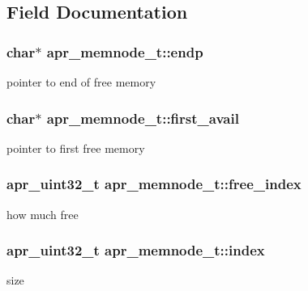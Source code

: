 \subsection{Field Documentation}
\subsubsection[{\texorpdfstring{endp}{endp}}]{\setlength{\rightskip}{0pt plus 5cm}char$\ast$ apr\+\_\+memnode\+\_\+t\+::endp}\hypertarget{structapr__memnode__t_a35c9bf71f1cc680929f857176b547a05}{}\label{structapr__memnode__t_a35c9bf71f1cc680929f857176b547a05}
pointer to end of free memory 
\subsubsection[{\texorpdfstring{first\+\_\+avail}{first_avail}}]{\setlength{\rightskip}{0pt plus 5cm}char$\ast$ apr\+\_\+memnode\+\_\+t\+::first\+\_\+avail}\hypertarget{structapr__memnode__t_a863e7980225e46678881271c4c803e4c}{}\label{structapr__memnode__t_a863e7980225e46678881271c4c803e4c}
pointer to first free memory 
\subsubsection[{\texorpdfstring{free\+\_\+index}{free_index}}]{\setlength{\rightskip}{0pt plus 5cm}apr\+\_\+uint32\+\_\+t apr\+\_\+memnode\+\_\+t\+::free\+\_\+index}\hypertarget{structapr__memnode__t_af63769f30f6eb9d72e4b24050bd7a9d9}{}\label{structapr__memnode__t_af63769f30f6eb9d72e4b24050bd7a9d9}
how much free 
\subsubsection[{\texorpdfstring{index}{index}}]{\setlength{\rightskip}{0pt plus 5cm}apr\+\_\+uint32\+\_\+t apr\+\_\+memnode\+\_\+t\+::index}\hypertarget{structapr__memnode__t_a6188325f9e1cbcafcb0a65b7e41881a1}{}\label{structapr__memnode__t_a6188325f9e1cbcafcb0a65b7e41881a1}
size 
